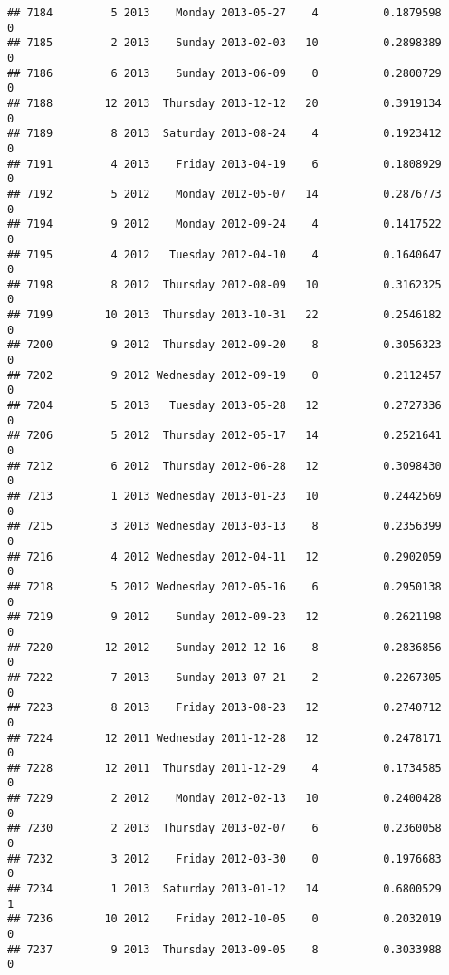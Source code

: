 \documentclass[
]{article}
\begin{document}
\begin{verbatim}
## 7184         5 2013    Monday 2013-05-27    4          0.1879598             0
## 7185         2 2013    Sunday 2013-02-03   10          0.2898389             0
## 7186         6 2013    Sunday 2013-06-09    0          0.2800729             0
## 7188        12 2013  Thursday 2013-12-12   20          0.3919134             0
## 7189         8 2013  Saturday 2013-08-24    4          0.1923412             0
## 7191         4 2013    Friday 2013-04-19    6          0.1808929             0
## 7192         5 2012    Monday 2012-05-07   14          0.2876773             0
## 7194         9 2012    Monday 2012-09-24    4          0.1417522             0
## 7195         4 2012   Tuesday 2012-04-10    4          0.1640647             0
## 7198         8 2012  Thursday 2012-08-09   10          0.3162325             0
## 7199        10 2013  Thursday 2013-10-31   22          0.2546182             0
## 7200         9 2012  Thursday 2012-09-20    8          0.3056323             0
## 7202         9 2012 Wednesday 2012-09-19    0          0.2112457             0
## 7204         5 2013   Tuesday 2013-05-28   12          0.2727336             0
## 7206         5 2012  Thursday 2012-05-17   14          0.2521641             0
## 7212         6 2012  Thursday 2012-06-28   12          0.3098430             0
## 7213         1 2013 Wednesday 2013-01-23   10          0.2442569             0
## 7215         3 2013 Wednesday 2013-03-13    8          0.2356399             0
## 7216         4 2012 Wednesday 2012-04-11   12          0.2902059             0
## 7218         5 2012 Wednesday 2012-05-16    6          0.2950138             0
## 7219         9 2012    Sunday 2012-09-23   12          0.2621198             0
## 7220        12 2012    Sunday 2012-12-16    8          0.2836856             0
## 7222         7 2013    Sunday 2013-07-21    2          0.2267305             0
## 7223         8 2013    Friday 2013-08-23   12          0.2740712             0
## 7224        12 2011 Wednesday 2011-12-28   12          0.2478171             0
## 7228        12 2011  Thursday 2011-12-29    4          0.1734585             0
## 7229         2 2012    Monday 2012-02-13   10          0.2400428             0
## 7230         2 2013  Thursday 2013-02-07    6          0.2360058             0
## 7232         3 2012    Friday 2012-03-30    0          0.1976683             0
## 7234         1 2013  Saturday 2013-01-12   14          0.6800529             1
## 7236        10 2012    Friday 2012-10-05    0          0.2032019             0
## 7237         9 2013  Thursday 2013-09-05    8          0.3033988             0

\end{verbatim}
\end{document}
